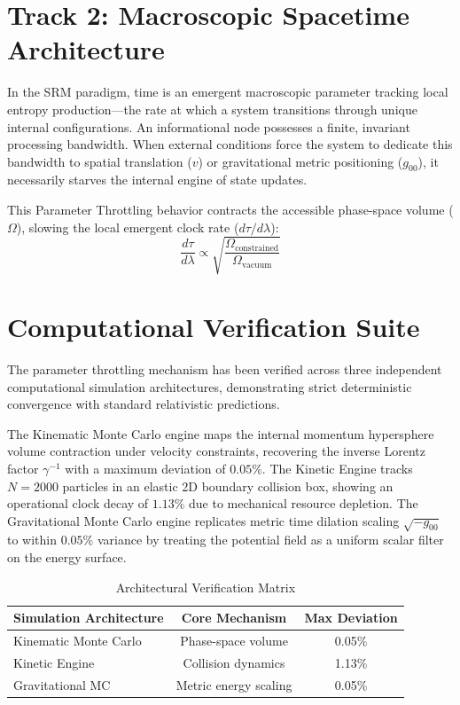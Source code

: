 \documentclass[twocolumn,prd,amsmath,amssymb,superscriptaddress]{revtex4-2}
\begin{document}
\section{Track 2: Macroscopic Spacetime Architecture}

In the SRM paradigm, time is an emergent macroscopic parameter tracking local entropy production—the rate at which a system transitions through unique internal configurations. An informational node possesses a finite, invariant processing bandwidth. When external conditions force the system to dedicate this bandwidth to spatial translation ($v$) or gravitational metric positioning ($g_{00}$), it necessarily starves the internal engine of state updates.

This Parameter Throttling behavior contracts the accessible phase-space volume ($\Omega$), slowing the local emergent clock rate ($d\tau/d\lambda$):
\begin{equation}
    \frac{d\tau}{d\lambda} \propto \sqrt{\frac{\Omega_{\text{constrained}}}{\Omega_{\text{vacuum}}}}
\end{equation}

\section{Computational Verification Suite}

The parameter throttling mechanism has been verified across three independent computational simulation architectures, demonstrating strict deterministic convergence with standard relativistic predictions. 

The Kinematic Monte Carlo engine maps the internal momentum hypersphere volume contraction under velocity constraints, recovering the inverse Lorentz factor $\gamma^{-1}$ with a maximum deviation of $0.05\%$. The Kinetic Engine tracks $N=2000$ particles in an elastic 2D boundary collision box, showing an operational clock decay of $1.13\%$ due to mechanical resource depletion. The Gravitational Monte Carlo engine replicates metric time dilation scaling $\sqrt{-g_{00}}$ to within $0.05\%$ variance by treating the potential field as a uniform scalar filter on the energy surface.

\begin{table}[h]
\caption{Architectural Verification Matrix}
\label{tab:metrics}
\begin{ruledtabular}
\begin{tabular}{lcc}
Simulation Architecture & Core Mechanism & Max Deviation \\
\hline
Kinematic Monte Carlo & Phase-space volume & 0.05\% \\
Kinetic Engine & Collision dynamics & 1.13\% \\
Gravitational MC & Metric energy scaling & 0.05\% \\
\end{tabular}
\end{ruledtabular}
\end{table}
\end{document}
